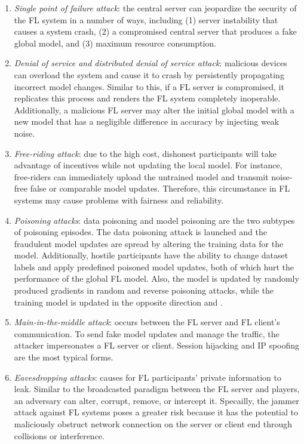 \documentclass{article}
\begin{document}
\begin{enumerate}
\item \textit{Single point of failure attack}: the central server can jeopardize the security of the FL system in a number of ways, including (1) server instability that causes a system crash, (2) a compromised central server that produces a fake global model, and (3) maximum resource consumption.
\item \textit{Denial of service and distributed denial of service attack}: malicious devices can overload the system and cause it to crash by persistently propagating incorrect model changes. Similar to this, if a FL server is compromised, it replicates this process and renders the FL system completely inoperable. Additionally, a malicious FL server may alter the initial global model with a new model that has a negligible difference in accuracy by injecting weak noise. 
\item \textit{Free-riding attack}: due to the high cost, dishonest participants will take advantage of incentives while not updating the local model. For instance, free-riders can immediately upload the untrained model and transmit noise-free false or comparable model updates. Therefore, this circumstance in FL systems may cause problems with fairness and reliability.
\item \textit{Poisoning attacks}: data poisoning and model poisoning are the two subtypes of poisoning episodes. The data poisoning attack is launched and the fraudulent model updates are spread by altering the training data for the model. Additionally, hostile participants have the ability to change dataset labels and apply predefined poisoned model updates, both of which hurt the performance of the global FL model.
Also, the model is updated by randomly produced gradients in random and reverse poisoning attacks, while the training model is updated in the opposite direction \cite{chen_2018} and \cite{li_bft_2021}.
\item \textit{Main-in-the-middle attack}: occurs between the FL server and FL client's communication. To send fake model updates and manage the traffic, the attacker impersonates a FL server or client. Session hijacking and IP spoofing are the most typical forms. 
\item \textit{Eavesdropping attacks}: causes for FL participants' private information to leak. Similar to the broadcasted paradigm between the FL server and players, an adversary can alter, corrupt, remove, or intercept it. Specailly, the jammer attack against FL systems poses a greater risk because it has the potential to maliciously obstruct network connection on the server or client end through collisions or interference.
\end{enumerate}
\end{document}
